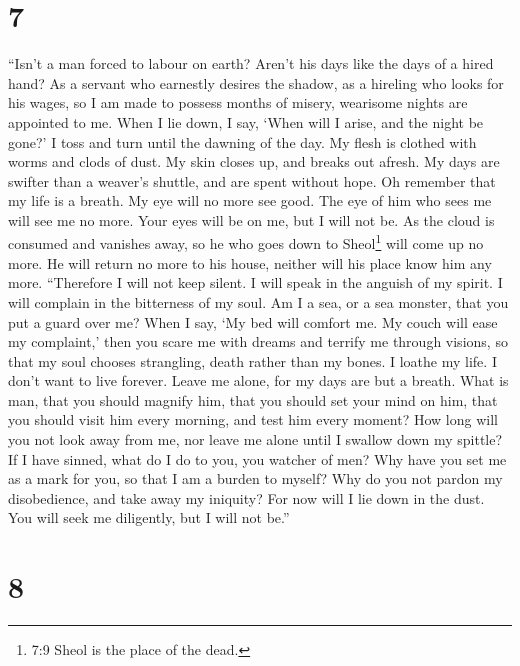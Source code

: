 \hypertarget{section-6}{%
\section{7}\label{section-6}}

 ``Isn't a man forced to labour on earth? Aren't his days
like the days of a hired hand?  As a servant who earnestly
desires the shadow, as a hireling who looks for his wages, 
so I am made to possess months of misery, wearisome nights are appointed
to me.  When I lie down, I say, `When will I arise, and the
night be gone?' I toss and turn until the dawning of the day.
 My flesh is clothed with worms and clods of dust. My skin
closes up, and breaks out afresh.  My days are swifter than
a weaver's shuttle, and are spent without hope.  Oh remember
that my life is a breath. My eye will no more see good.  The
eye of him who sees me will see me no more. Your eyes will be on me, but
I will not be.  As the cloud is consumed and vanishes away,
so he who goes down to Sheol\footnote{7:9 Sheol is the place of the
  dead.} will come up no more.  He will return no more to
his house, neither will his place know him any more. 
``Therefore I will not keep silent. I will speak in the anguish of my
spirit. I will complain in the bitterness of my soul.  Am I
a sea, or a sea monster, that you put a guard over me? 
When I say, `My bed will comfort me. My couch will ease my complaint,'
 then you scare me with dreams and terrify me through
visions,  so that my soul chooses strangling, death rather
than my bones.  I loathe my life. I don't want to live
forever. Leave me alone, for my days are but a breath. 
What is man, that you should magnify him, that you should set your mind
on him,  that you should visit him every morning, and test
him every moment?  How long will you not look away from me,
nor leave me alone until I swallow down my spittle?  If I
have sinned, what do I do to you, you watcher of men? Why have you set
me as a mark for you, so that I am a burden to myself?  Why
do you not pardon my disobedience, and take away my iniquity? For now
will I lie down in the dust. You will seek me diligently, but I will not
be.''

\hypertarget{section-7}{%
\section{8}\label{section-7}}


